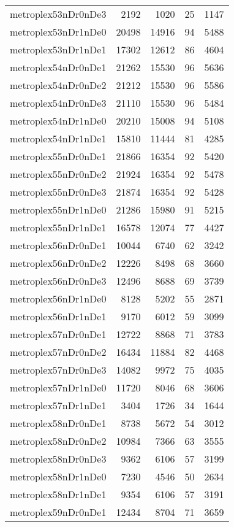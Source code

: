 \begin{longtable}{lrrrr}
metroplex53nDr0nDe3 & 2192 & 1020 & 25 & 1147 \\
metroplex53nDr1nDe0 & 20498 & 14916 & 94 & 5488 \\
metroplex53nDr1nDe1 & 17302 & 12612 & 86 & 4604 \\
metroplex54nDr0nDe1 & 21262 & 15530 & 96 & 5636 \\
metroplex54nDr0nDe2 & 21212 & 15530 & 96 & 5586 \\
metroplex54nDr0nDe3 & 21110 & 15530 & 96 & 5484 \\
metroplex54nDr1nDe0 & 20210 & 15008 & 94 & 5108 \\
metroplex54nDr1nDe1 & 15810 & 11444 & 81 & 4285 \\
metroplex55nDr0nDe1 & 21866 & 16354 & 92 & 5420 \\
metroplex55nDr0nDe2 & 21924 & 16354 & 92 & 5478 \\
metroplex55nDr0nDe3 & 21874 & 16354 & 92 & 5428 \\
metroplex55nDr1nDe0 & 21286 & 15980 & 91 & 5215 \\
metroplex55nDr1nDe1 & 16578 & 12074 & 77 & 4427 \\
metroplex56nDr0nDe1 & 10044 & 6740 & 62 & 3242 \\
metroplex56nDr0nDe2 & 12226 & 8498 & 68 & 3660 \\
metroplex56nDr0nDe3 & 12496 & 8688 & 69 & 3739 \\
metroplex56nDr1nDe0 & 8128 & 5202 & 55 & 2871 \\
metroplex56nDr1nDe1 & 9170 & 6012 & 59 & 3099 \\
metroplex57nDr0nDe1 & 12722 & 8868 & 71 & 3783 \\
metroplex57nDr0nDe2 & 16434 & 11884 & 82 & 4468 \\
metroplex57nDr0nDe3 & 14082 & 9972 & 75 & 4035 \\
metroplex57nDr1nDe0 & 11720 & 8046 & 68 & 3606 \\
metroplex57nDr1nDe1 & 3404 & 1726 & 34 & 1644 \\
metroplex58nDr0nDe1 & 8738 & 5672 & 54 & 3012 \\
metroplex58nDr0nDe2 & 10984 & 7366 & 63 & 3555 \\
metroplex58nDr0nDe3 & 9362 & 6106 & 57 & 3199 \\
metroplex58nDr1nDe0 & 7230 & 4546 & 50 & 2634 \\
metroplex58nDr1nDe1 & 9354 & 6106 & 57 & 3191 \\
metroplex59nDr0nDe1 & 12434 & 8704 & 71 & 3659 \\

\end{longtable}
